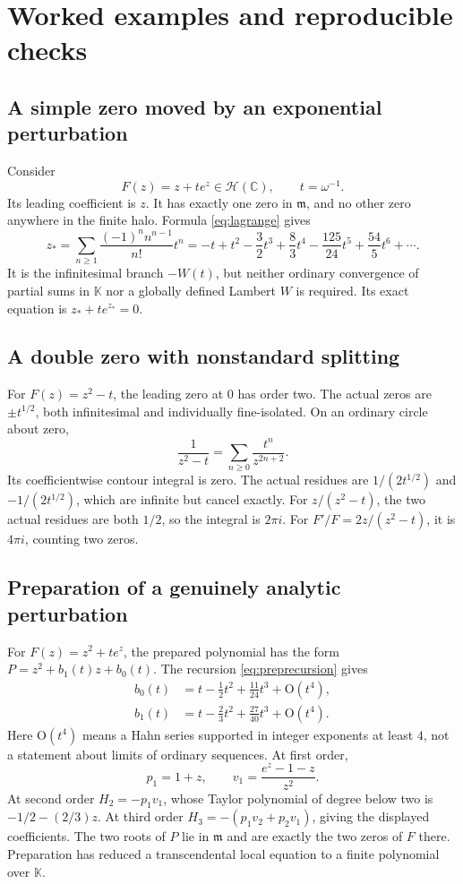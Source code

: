 \documentclass[11pt,letterpaper]{article}
\numberwithin{equation}{section}
\theoremstyle{definition}
\theoremstyle{remark}
\newcommand{\K}{\mathbb{K}}
\newcommand{\C}{\mathbb{C}}
\newcommand{\mm}{\mathfrak{m}}
\newcommand{\HH}{\mathcal{H}}
\newcommand{\bigo}{\mathrm{O}}
\begin{document}
\section{Worked examples and reproducible checks}\label{sec:examples}

\subsection{A simple zero moved by an exponential perturbation}

Consider
\[
 F(z)=z+t e^z\in\HH(\C),\qquad t=\omega^{-1}.
\]
Its leading coefficient is $z$. It has exactly one zero in $\mm$, and no
other zero anywhere in the finite halo. Formula \eqref{eq:lagrange} gives
\begin{equation}\label{eq:Wexample}
 z_* =\sum_{n\ge1}\frac{(-1)^n n^{n-1}}{n!}t^n
 =-t+t^2-\frac32t^3+\frac83t^4-\frac{125}{24}t^5
       +\frac{54}{5}t^6+\cdots.
\end{equation}
It is the infinitesimal branch $-W(t)$, but neither ordinary convergence of
partial sums in $\K$ nor a globally defined Lambert $W$ is required. Its
exact equation is $z_*+t e^{z_*}=0$.

\subsection{A double zero with nonstandard splitting}

For $F(z)=z^2-t$, the leading zero at $0$ has order two. The actual zeros
are $\pm t^{1/2}$, both infinitesimal and individually fine-isolated.
On an ordinary circle about zero,
\[
 \frac1{z^2-t}=\sum_{n\ge0}\frac{t^n}{z^{2n+2}}.
\]
Its coefficientwise contour integral is zero. The actual residues are
$1/(2t^{1/2})$ and $-1/(2t^{1/2})$, which are infinite but cancel exactly.
For $z/(z^2-t)$, the two actual residues are both $1/2$, so the integral is
$2\pi i$. For $F'/F=2z/(z^2-t)$, it is $4\pi i$, counting two zeros.

\subsection{Preparation of a genuinely analytic perturbation}

For $F(z)=z^2+t e^z$, the prepared polynomial has the form
$P=z^2+b_1(t)z+b_0(t)$. The recursion \eqref{eq:preprecursion} gives
\begin{align}
 b_0(t)&=t-\tfrac12t^2+\tfrac{11}{24}t^3+\bigo(t^4),\label{eq:prep-example0}\\
 b_1(t)&=t-\tfrac23t^2+\tfrac{27}{40}t^3+\bigo(t^4).\label{eq:prep-example1}
\end{align}
Here $\bigo(t^4)$ means a Hahn series supported in integer exponents at least
$4$, not a statement about limits of ordinary sequences. At first order,
\[
 p_1=1+z,\qquad v_1=\frac{e^z-1-z}{z^2}.
\]
At second order $H_2=-p_1v_1$, whose Taylor polynomial of degree below two is
$-1/2-(2/3)z$. At third order
$H_3=-(p_1v_2+p_2v_1)$, giving the displayed coefficients. The two roots of
$P$ lie in $\mm$ and are exactly the two zeros of $F$ there. Preparation has
reduced a transcendental local equation to a finite polynomial over $\K$.
\end{document}
